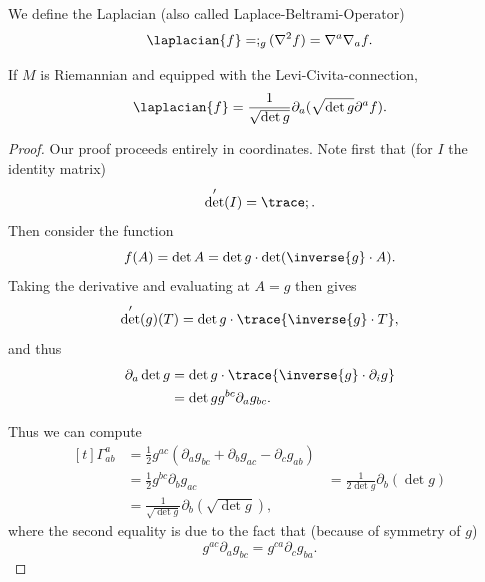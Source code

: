 \documentclass[titlepage,numbers=noenddot,headinclude,oneside,%
footinclude=true,cleardoublepage=empty,%
BCOR=5mm,paper=a4,fontsize=11pt,%
english,%
]{scrartcl}
\begin{document}
\begin{definition}
    We define the Laplacian (also called Laplace-Beltrami-Operator)
    \begin{equation*}
        \laplacian{f}=;_g(\nabla^2 f)=\nabla^a \nabla_a f.
    \end{equation*}
\end{definition}
\begin{lemma}\label{lem:laplacian_in_terms_of_metric_determinant}
    If \( M \) is Riemannian and equipped with the Levi-Civita-connection,
    \begin{equation*}
        \laplacian{f}=\frac{1}{\sqrt{\det{g}}}\partial_{a}(\sqrt{\det{g}}\partial^a f).
    \end{equation*}    
\end{lemma}
\begin{proof}
    Our proof proceeds entirely in coordinates. Note first that (for \( I \) the identity matrix)
    \begin{equation*}
        \det'(I)=\trace;.
    \end{equation*}
    Then consider the function
    \begin{equation*}
        f(A)=\det{A}=\det{g}\cdot \det(\inverse{g}\cdot A).
    \end{equation*}
    Taking the derivative and evaluating at \( A=g \) then gives
    \begin{equation*}
        \det'(g)(T)=\det{g}\cdot \trace{\inverse{g}\cdot T},
    \end{equation*}
    and thus
    \begin{equation*}
        \begin{aligned}[t]
            \partial_a \det{g}&=\det{g}\cdot \trace{\inverse{g}\cdot \partial_i g}\\
            &=\det{g}g^{bc}\partial_{a}g_{bc}.
        \end{aligned}
    \end{equation*}

    Thus we can compute
    \begin{equation*}
        \begin{aligned}[t]
            \Gamma^{a}_{ab}&=\frac{1}{2}g^{ac}(\partial_a g_{bc}+\partial_b g_{ac}-\partial_c g_{ab})\\
            &=\frac{1}{2}g^{bc}\partial_b g_{ac}
            &=\frac{1}{2\det{g}}\partial_b(\det{g})\\
            &=\frac{1}{\sqrt{\det{g}}}\partial_b(\sqrt{\det{g}}),
        \end{aligned}
    \end{equation*}
    where the second equality is due to the fact that (because of symmetry of \( g \))
    \begin{equation*}
        g^{ac}\partial_{a}g_{bc}=g^{ca}\partial_c g_{ba}.
    \end{equation*}


\end{proof}
\end{document}
